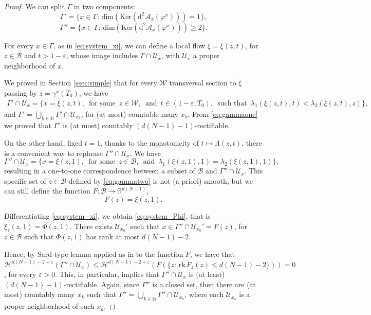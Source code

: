 \documentclass[a4paper,10pt]{amsart}
\newcommand{\numberset}{\mathbb}
\newcommand{\R}{\numberset{R}}
\newcommand{\ud}{\mathrm{d}}
\theoremstyle{plain}
\theoremstyle{definition}
\numberwithin{equation}{section}
\numberwithin{thm}{section}
\begin{document}
\begin{proof}
We can split $\Gamma$ in two components:
\[
 \Gamma'=\{x \in \Gamma:\, \mathrm{dim}(\mathrm{Ker}(\ud^2 \mathcal A_{x}(\varphi^{x})))=1\},
\]
\[
\Gamma''=\{x \in \Gamma:\, \mathrm{dim}(\mathrm{Ker}(\ud^2 \mathcal A_{x}(\varphi^{x})))\ge 2\}.
\]

For every $x \in \Gamma$, as in \ref{eq:system_xi}, we can define a local flow $\xi=\xi(z,t)$, for $z \in \mathcal B$ and $t >1-\varepsilon$, whose image includes $\Gamma \cap \mathcal U_{x}$, with $\mathcal U_{x}$ a proper neighborhood of $x$.
 
We proved in Section \ref{ssec:simple} that for every $\mathcal W$  transversal section to $\dot \xi$ passing by $z=\gamma^x(T_0)$, we have
\begin{multline*}
    \Gamma'\cap \mathcal U_{x} =
    \{x=\xi(z,t),\,\mbox{ for some } \, z \in \mathcal W,\, \mbox{ and } \, t \in (1-\varepsilon, T_0),\, \mbox{ such that } \, \lambda_1(\xi(z,t),t)<\lambda_2(\xi(z,t),z)\},
\end{multline*}
and $\Gamma' = \bigcup_{k \in \mathbb N}\Gamma'\cap \mathcal U_{x_k}$, for (at most) countable many $x_k$. From \eqref{eq:gammaone} we proved that $\Gamma'$ is (at most) countably $(d(N-1)-1)$-rectifiable.

On the other hand, fixed $t=1$, thanks to the monotonicity of $t \mapsto \Lambda(z,t)$, there is a convenient way to rephrase $\Gamma''\cap \mathcal U_{x}$. We have
\begin{equation}
\label{eq:gammatwo}
\Gamma''\cap \mathcal U_{x}=\{x=\xi(z,1),\, \mbox{ for some }\, z \in \mathcal B,\, \mbox{ and }\, \lambda_1(\xi(z,1),1)=\lambda_2(\xi(z,1),1)\},
\end{equation}
resulting in a one-to-one correspondence between a subset of $\mathcal B$ and $\Gamma'' \cap \mathcal U_{x}$. This specific set of $z \in \mathcal B$ defined by \eqref{eq:gammatwo} is not (a priori) smooth, but we can still define the function $F:\mathcal{B}\rightarrow\R^{d(N-1)}$,
\[
F(z) = \xi(z,1).
\]


Differentiating \eqref{eq:system_xi}, we obtain \eqref{eq:system_Phi}, that is $\xi_z(z,1)=\Phi(z,1)$. There exists $\mathcal U_{x_0}'$ such that $x \in \Gamma'' \cap \mathcal U_{x_0}' = F(z)$, for $z \in \mathcal{B}$ such that $\Phi(z,1)$ has rank at most $d(N-1)-2$.  

Hence, by Sard-type lemma applied as in \cite[Lemma 6.6.1]{MR2041617} to the function $F$, we have that $\mathcal{H}^{d(N-1)-2+\varepsilon}(\Gamma''\cap \mathcal{U}_x) \le \mathcal H^{d(N-1)-2+\varepsilon}(F(\{z:\, \mathrm{rk}\,F_z(z) \le d(N-1)-2 \}))= 0$, for every $\varepsilon>0$. This, in particular, implies that $\Gamma''\cap \mathcal U_x$ is (at least) $(d(N-1)-1)$-rectifiable. Again, since $\Gamma''$ is a closed set, then there are (at most) countably many $x_k$ such that $\Gamma'' = \bigcup_{k \in \mathbb N} \Gamma''\cap \mathcal U_{x_k}$, where each $\mathcal U_{x_k}$ is a proper neighborhood of such $x_k$.
\end{proof}
\end{document}
